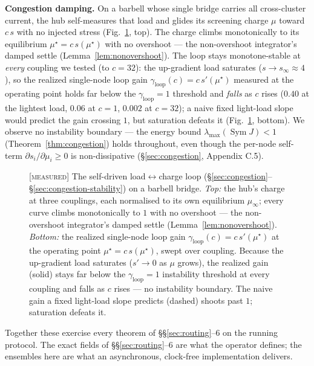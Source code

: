 \documentclass[11pt]{article}
\theoremstyle{plain}
\numberwithin{equation}{section}
\begin{document}
\textbf{Congestion damping.} On a barbell whose single bridge carries all cross-cluster current, the hub self-measures that load and glides its screening charge $\mu$ toward $c\,s$ with no injected stress (Fig.~\ref{fig:congestion}, top). The charge climbs monotonically to its equilibrium $\mu^\star=c\,s(\mu^\star)$ with no overshoot — the non-overshoot integrator's damped settle (Lemma~\ref{lem:nonovershoot}). The loop stays monotone-stable at \emph{every} coupling we tested (to $c=32$): the up-gradient load saturates ($s\to s_\infty\!\approx\!4$), so the realized single-node loop gain $\gamma_{\mathrm{loop}}(c)=c\,s'(\mu^\star)$ measured at the operating point holds far below the $\gamma_{\mathrm{loop}}=1$ threshold and \emph{falls} as $c$ rises ($0.40$ at the lightest load, $0.06$ at $c=1$, $0.002$ at $c=32$); a naive fixed light-load slope would predict the gain crossing $1$, but saturation defeats it (Fig.~\ref{fig:congestion}, bottom). We observe no instability boundary — the energy bound $\lambda_{\max}(\operatorname{Sym}J)<1$ (Theorem~\ref{thm:congestion}) holds throughout, even though the per-node self-term $\partial s_i/\partial\mu_i\ge0$ is non-dissipative (§\ref{sec:congestion}, Appendix C.5).

\begin{figure}[tbp]
\centering

\caption{\textsc{[measured]} The self-driven load$\leftrightarrow$charge loop (§\ref{sec:congestion}–§\ref{sec:congestion-stability}) on a barbell bridge. \emph{Top:} the hub's charge at three couplings, each normalised to its own equilibrium $\mu_\infty$; every curve climbs monotonically to $1$ with no overshoot — the non-overshoot integrator's damped settle (Lemma~\ref{lem:nonovershoot}). \emph{Bottom:} the realized single-node loop gain $\gamma_{\mathrm{loop}}(c)=c\,s'(\mu^\star)$ at the operating point $\mu^\star=c\,s(\mu^\star)$, swept over coupling. Because the up-gradient load saturates ($s'\!\to\!0$ as $\mu$ grows), the realized gain (solid) stays far below the $\gamma_{\mathrm{loop}}=1$ instability threshold at every coupling and falls as $c$ rises — no instability boundary. The naive gain a fixed light-load slope predicts (dashed) shoots past $1$; saturation defeats it.}
\label{fig:congestion}
\end{figure}

Together these exercise every theorem of §§\ref{sec:routing}--6 on the running protocol. The exact fields of §§\ref{sec:routing}--6 are what the operator defines; the ensembles here are what an asynchronous, clock-free implementation delivers.
\end{document}
